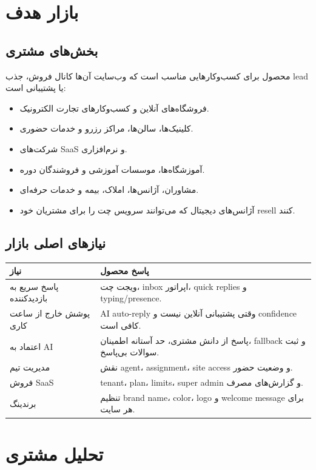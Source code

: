 \documentclass[12pt,a4paper]{article}
\begin{document}
\section{بازار هدف}
\subsection{بخش‌های مشتری}
محصول برای کسب‌وکارهایی مناسب است که وب‌سایت آن‌ها کانال فروش، جذب lead یا پشتیبانی است:
\begin{itemize}
  \item فروشگاه‌های آنلاین و کسب‌وکارهای تجارت الکترونیک.
  \item کلینیک‌ها، سالن‌ها، مراکز رزرو و خدمات حضوری.
  \item شرکت‌های SaaS و نرم‌افزاری.
  \item آموزشگاه‌ها، موسسات آموزشی و فروشندگان دوره.
  \item مشاوران، آژانس‌ها، املاک، بیمه و خدمات حرفه‌ای.
  \item آژانس‌های دیجیتال که می‌توانند سرویس چت را برای مشتریان خود resell کنند.
\end{itemize}

\subsection{نیازهای اصلی بازار}
\begin{longtable}{R{45mm} R{93mm}}
\toprule
\textbf{نیاز} & \textbf{پاسخ محصول} \\
\midrule
\endhead
پاسخ سریع به بازدیدکننده & ویجت چت، inbox اپراتور، quick replies و typing/presence. \\
پوشش خارج از ساعت کاری & AI auto-reply وقتی پشتیبانی آنلاین نیست و confidence کافی است. \\
اعتماد به AI & پاسخ از دانش مشتری، حد آستانه اطمینان، fallback و ثبت سوالات بی‌پاسخ. \\
مدیریت تیم & نقش agent، assignment، site access و وضعیت حضور. \\
فروش SaaS & tenant، plan، limits، super admin و گزارش‌های مصرف. \\
برندینگ & تنظیم brand name، color، logo و welcome message برای هر سایت. \\
\bottomrule
\end{longtable}

\section{تحلیل مشتری}
\end{document}
